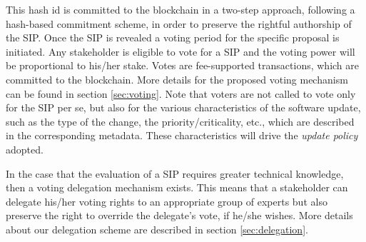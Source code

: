  This hash id is committed to the blockchain in a two-step approach, following a hash-based commitment scheme, in order to preserve the rightful authorship of the SIP.
Once the SIP is revealed a voting period for the specific proposal is 
initiated. Any stakeholder is eligible to vote for a SIP and the voting power 
will be proportional to his/her stake. Votes are fee-supported transactions, 
which are committed to the blockchain. More details for the proposed voting 
mechanism can be found in section \ref{sec:voting}. Note that voters are not 
called to vote only for the SIP per se, but also for the various 
characteristics of the software update, such as the type of the change, the 
priority/criticality, etc., which are described in the corresponding metadata. 
These characteristics will drive the \emph{update policy} adopted.

In the case that the evaluation of a SIP requires greater technical knowledge, 
then a voting delegation mechanism exists. This means that a stakeholder can 
delegate his/her voting rights to an appropriate group of experts but also 
preserve the right to override the delegate's vote, if he/she wishes. More 
details about our delegation scheme are described in section 
\ref{sec:delegation}. 

